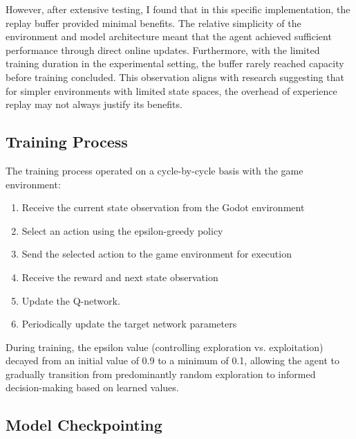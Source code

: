 However, after extensive testing, I found that in this specific implementation, the replay buffer provided minimal benefits. 
The relative simplicity of the environment and model architecture meant that the agent achieved sufficient performance through direct online updates. 
Furthermore, with the limited training duration in the experimental setting, the buffer rarely reached capacity before training concluded. 
This observation aligns with research suggesting that for simpler environments with limited state spaces, the overhead of experience replay may not always justify its benefits.

\subsection{Training Process}

The training process operated on a cycle-by-cycle basis with the game environment:

\begin{enumerate}
    \item Receive the current state observation from the Godot environment
    \item Select an action using the epsilon-greedy policy
    \item Send the selected action to the game environment for execution
    \item Receive the reward and next state observation
    \item Update the Q-network.
    \item Periodically update the target network parameters
\end{enumerate}

During training, the epsilon value (controlling exploration vs. exploitation) decayed from an initial value of 0.9 to a minimum of 0.1, 
allowing the agent to gradually transition from predominantly random exploration to informed decision-making based on learned values.

\subsection{Model Checkpointing}

